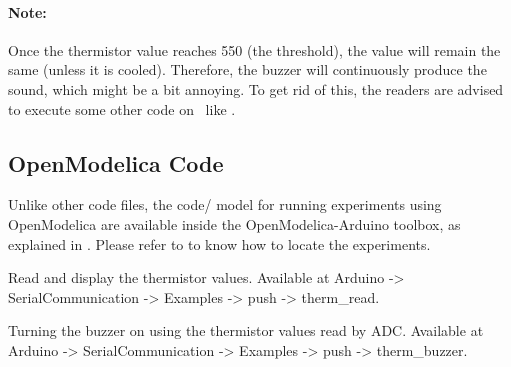 \begin{enumerate}
        \paragraph{Note:} Once the thermistor value reaches 550 (the threshold), the value will remain the same
        (unless it is cooled). Therefore, the buzzer will continuously produce the sound, which might be
        a bit annoying. To get rid of this, the readers are advised to
        execute some other code on \arduino\ like .

\end{enumerate}

\subsection{OpenModelica Code}
Unlike other code files, the code/ model for running experiments using OpenModelica are 
available inside the OpenModelica-Arduino toolbox, as explained in .
Please refer to  to know how to locate the experiments. 

\label{sec:therm-OpenModelica-code}

\begin{OpenModelicacode}
   {Read and display
    the thermistor values.  Available at
    Arduino -> SerialCommunication -> 
  Examples -> push -> therm\_read.}
  \label{OpenModelica:therm-read}
  
\end{OpenModelicacode}

\begin{OpenModelicacode}
  {Turning the buzzer on using the thermistor values read by
    ADC.  Available at
    Arduino -> SerialCommunication -> 
  Examples -> push -> therm\_buzzer.}
  \label{OpenModelica:therm-buzzer}
  
\end{OpenModelicacode}
